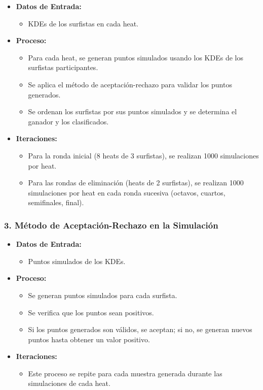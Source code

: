 \documentclass[12pt]{article}
\begin{document}
\begin{itemize}
    \item \textbf{Datos de Entrada:}
        \begin{itemize}
            \item KDEs de los surfistas en cada heat.
        \end{itemize}
    \item \textbf{Proceso:}
        \begin{itemize}
            \item Para cada heat, se generan puntos simulados usando los KDEs de los surfistas participantes.
            \item Se aplica el método de aceptación-rechazo para validar los puntos generados.
            \item Se ordenan los surfistas por sus puntos simulados y se determina el ganador y los clasificados.
        \end{itemize}
    \item \textbf{Iteraciones:}
        \begin{itemize}
            \item Para la ronda inicial (8 heats de 3 surfistas), se realizan 1000 simulaciones por heat.
            \item Para las rondas de eliminación (heats de 2 surfistas), se realizan 1000 simulaciones por heat en cada ronda sucesiva (octavos, cuartos, semifinales, final).
        \end{itemize}
\end{itemize}

\subsubsection*{3. Método de Aceptación-Rechazo en la Simulación}

\begin{itemize}
    \item \textbf{Datos de Entrada:}
        \begin{itemize}
            \item Puntos simulados de los KDEs.
        \end{itemize}
    \item \textbf{Proceso:}
        \begin{itemize}
            \item Se generan puntos simulados para cada surfista.
            \item Se verifica que los puntos sean positivos.
            \item Si los puntos generados son válidos, se aceptan; si no, se generan nuevos puntos hasta obtener un valor positivo.
        \end{itemize}
    \item \textbf{Iteraciones:}
        \begin{itemize}
            \item Este proceso se repite para cada muestra generada durante las simulaciones de cada heat.
        \end{itemize}
\end{itemize}
\end{document}
